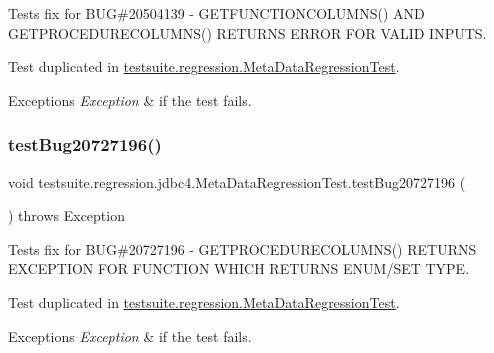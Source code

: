 Tests fix for B\+UG\#20504139 -\/ G\+E\+T\+F\+U\+N\+C\+T\+I\+O\+N\+C\+O\+L\+U\+M\+N\+S() A\+ND G\+E\+T\+P\+R\+O\+C\+E\+D\+U\+R\+E\+C\+O\+L\+U\+M\+N\+S() R\+E\+T\+U\+R\+NS E\+R\+R\+OR F\+OR V\+A\+L\+ID I\+N\+P\+U\+TS.

Test duplicated in \mbox{\hyperlink{classtestsuite_1_1regression_1_1_meta_data_regression_test}{testsuite.\+regression.\+Meta\+Data\+Regression\+Test}}.


\begin{DoxyExceptions}{Exceptions}
{\em Exception} & if the test fails. \\
\hline
\end{DoxyExceptions}
\mbox{\label{classtestsuite_1_1regression_1_1jdbc4_1_1_meta_data_regression_test_a2436308a4107cd00c52ef6460de3d2d3}} 
\subsubsection{\texorpdfstring{test\+Bug20727196()}{testBug20727196()}}
{\footnotesize\ttfamily void testsuite.\+regression.\+jdbc4.\+Meta\+Data\+Regression\+Test.\+test\+Bug20727196 (\begin{DoxyParamCaption}{ }\end{DoxyParamCaption}) throws Exception}

Tests fix for B\+UG\#20727196 -\/ G\+E\+T\+P\+R\+O\+C\+E\+D\+U\+R\+E\+C\+O\+L\+U\+M\+N\+S() R\+E\+T\+U\+R\+NS E\+X\+C\+E\+P\+T\+I\+ON F\+OR F\+U\+N\+C\+T\+I\+ON W\+H\+I\+CH R\+E\+T\+U\+R\+NS E\+N\+U\+M/\+S\+ET T\+Y\+PE.

Test duplicated in \mbox{\hyperlink{classtestsuite_1_1regression_1_1_meta_data_regression_test}{testsuite.\+regression.\+Meta\+Data\+Regression\+Test}}.


\begin{DoxyExceptions}{Exceptions}
{\em Exception} & if the test fails. \\
\hline
\end{DoxyExceptions}
\mbox{\label{classtestsuite_1_1regression_1_1jdbc4_1_1_meta_data_regression_test_a4208bd802fb2c7e89448921c5e1266a3}} 

